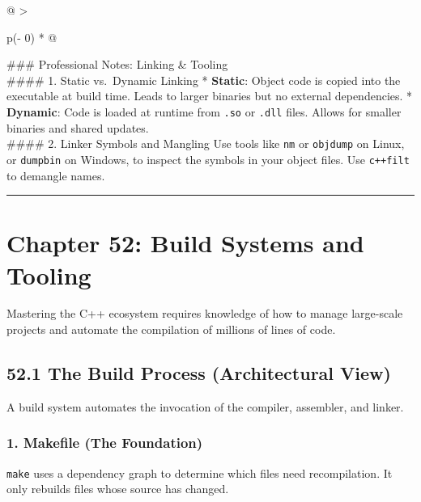 \begin{longtable}[]{@{}
  >{\raggedright\arraybackslash}p{(\columnwidth - 0\tabcolsep) * }@{}}
\toprule
\endhead
\#\#\# Professional Notes: Linking \& Tooling \\
\#\#\#\# 1. Static vs.~Dynamic Linking * \textbf{Static}: Object code is
copied into the executable at build time. Leads to larger binaries but
no external dependencies. * \textbf{Dynamic}: Code is loaded at runtime
from \passthrough{\lstinline!.so!} or \passthrough{\lstinline!.dll!}
files. Allows for smaller binaries and shared updates. \\
\#\#\#\# 2. Linker Symbols and Mangling Use tools like
\passthrough{\lstinline!nm!} or \passthrough{\lstinline!objdump!} on
Linux, or \passthrough{\lstinline!dumpbin!} on Windows, to inspect the
symbols in your object files. Use \passthrough{\lstinline!c++filt!} to
demangle names. \\
\bottomrule
\end{longtable}

\begin{center}\rule{0.5\linewidth}{0.5pt}\end{center}

\hypertarget{chapter-52-build-systems-and-tooling}{%
\chapter{Chapter 52: Build Systems and
Tooling}\label{chapter-52-build-systems-and-tooling}}

Mastering the C++ ecosystem requires knowledge of how to manage
large-scale projects and automate the compilation of millions of lines
of code.

\hypertarget{the-build-process-architectural-view}{%
\section{52.1 The Build Process (Architectural
View)}\label{the-build-process-architectural-view}}

A build system automates the invocation of the compiler, assembler, and
linker.

\hypertarget{makefile-the-foundation}{%
\subsection{1. Makefile (The
Foundation)}\label{makefile-the-foundation}}

\passthrough{\lstinline!make!} uses a dependency graph to determine
which files need recompilation. It only rebuilds files whose source has
changed.


